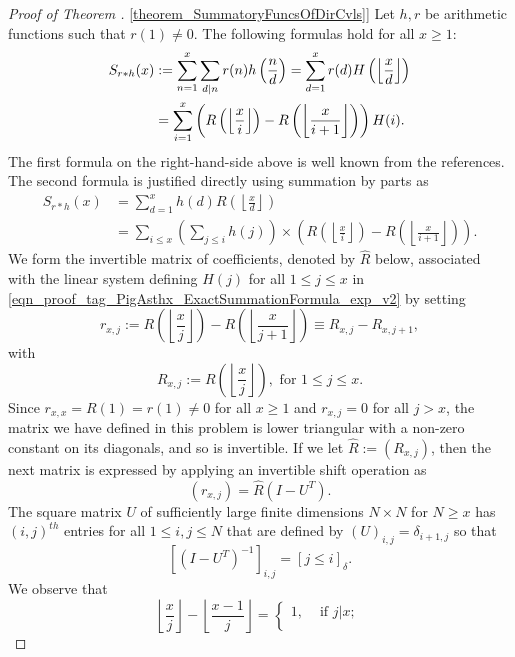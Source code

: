 \documentclass[11pt,reqno,a4letter]{article}
\newcommand{\hlocalref}[1]{\hyperref[#1]{\ref{#1}}}
\numberwithin{equation}{section}
\numberwithin{figure}{section}
\numberwithin{table}{section}
\newcommand{\Iverson}[1]{\ensuremath{\left[#1\right]_{\delta}}}
\newcommand{\floor}[1]{\left\lfloor #1 \right\rfloor}
\newcommand{\Floor}[2]{\ensuremath{\left\lfloor \frac{#1}{#2} \right\rfloor}}
\theoremstyle{plain}
\numberwithin{theorem}{section}
\theoremstyle{definition}
\begin{document}
\begin{proof}[Proof of Theorem \hlocalref{theorem_SummatoryFuncsOfDirCvls}] 
\label{proofOf_theorem_SummatoryFuncsOfDirCvls} 
Let $h,r$ be arithmetic functions such that $r(1) \neq 0$. 
The following formulas hold for all $x \geq 1$: 
\begin{align} 
\notag 
S_{r \ast h}(x) & := \sum_{n=1}^{x} \sum_{d|n} r(n) h\left(\frac{n}{d}\right) = 
     \sum_{d=1}^x r(d) H\left(\floor{\frac{x}{d}}\right) \\ 
\label{eqn_proof_tag_PigAsthx_ExactSummationFormula_exp_v2} 
     & = \sum_{i=1}^x \left(R\left(\floor{\frac{x}{i}}\right) - R\left(\floor{\frac{x}{i+1}}\right)\right) H(i). 
\end{align} 
The first formula on the right-hand-side above is well known from the references. 
The second formula is justified directly using 
summation by parts as \cite[\S 2.10(ii)]{NISTHB} 
\begin{align*} 
S_{r \ast h}(x) & = \sum_{d=1}^x h(d) R\left(\floor{\frac{x}{d}}\right) \\ 
     & = \sum_{i \leq x} \left(\sum_{j \leq i} h(j)\right) \times 
     \left(R\left(\floor{\frac{x}{i}}\right) - 
     R\left(\floor{\frac{x}{i+1}}\right)\right). 
\end{align*} 
We form the invertible matrix of coefficients, denoted by $\hat{R}$ below, 
associated with the linear system defining $H(j)$ for all 
$1 \leq j \leq x$ in \eqref{eqn_proof_tag_PigAsthx_ExactSummationFormula_exp_v2} by setting 
\[
r_{x,j} := R\left(\floor{\frac{x}{j}}\right) - R\left(\floor{\frac{x}{j+1}}\right) 
     \equiv R_{x,j} - R_{x,j+1}, 
\] 
with 
\[
R_{x,j} := R\left(\Floor{x}{j}\right), \text{ for } 1 \leq j \leq x. 
\]
Since $r_{x,x} = R(1) = r(1) \neq 0$ for all $x \geq 1$ and $r_{x,j} = 0$ for all $j > x$, 
the matrix we have defined in this problem is lower triangular with a non-zero 
constant on its diagonals, and so is invertible. 
If we let $\hat{R} := (R_{x,j})$, then the next matrix is 
expressed by applying an invertible shift operation as 
\[
(r_{x,j}) = \hat{R} \left(I - U^{T}\right). 
\]
The square matrix $U$ of sufficiently large finite dimensions $N \times N$ for $N \geq x$ 
has $(i,j)^{th}$ entries for all $1 \leq i,j \leq N$ that are defined by 
$(U)_{i,j} = \delta_{i+1,j}$ so that 
\[
\left[\left(I - U^T\right)^{-1}\right]_{i,j} = \Iverson{j \leq i}. 
\]
We observe that 
\[
\Floor{x}{j} - \Floor{x-1}{j} = \begin{cases} 
     1, & \text{ if $j|x$; } \\ 

\end{cases}\]
\end{proof}
\end{document}

